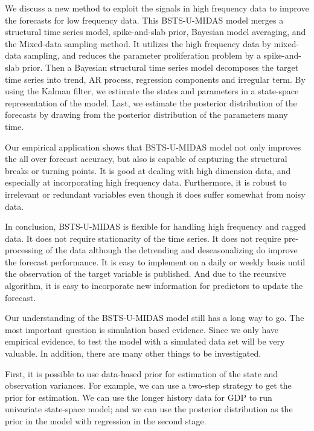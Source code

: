 \label{concl}

We discuss a new method to exploit the signals in high frequency data to improve the forecasts for low frequency data. This BSTS-U-MIDAS model merges a structural time series model, spike-and-slab prior,  Bayesian model averaging, and the Mixed-data sampling method. It utilizes the high frequency data by mixed-data sampling, and reduces the parameter proliferation problem by a spike-and-slab prior. Then a Bayesian structural time series model decomposes the target time series into trend, AR process, regression components and irregular term. By using the Kalman filter, we estimate the states and parameters in a state-space representation of the model. Last, we estimate the posterior distribution of the forecasts by drawing from the posterior distribution of the parameters many time. 

Our empirical application shows that BSTS-U-MIDAS model not only improves the all over forecast accuracy, but also is capable of capturing the structural breaks or turning points. It is good at dealing with high dimension data, and especially at incorporating high frequency data. Furthermore, it is robust to irrelevant or redundant variables even though it does suffer somewhat from noisy data. 


In conclusion, BSTS-U-MIDAS is flexible for handling high frequency and ragged data. It does not require stationarity of the time series. It does not require pre-processing of the data although the detrending and deseasonalizing do improve the forecast performance. It is easy to implement on a daily or weekly basis until  the observation of the target variable is published. And due to the recursive algorithm, it is easy to incorporate new information for predictors to update the forecast.   




Our understanding of the BSTS-U-MIDAS model still has a long way to go. The most important question is simulation based evidence. Since we only have empirical evidence, to test the model with a simulated data set will be very valuable. In addition, there are many other things to be investigated. 

First, it is possible to use data-based prior for estimation of the state and observation variances. For example, we can use a two-step strategy to get the prior for estimation. We can use the longer history data for GDP to run  univariate state-space model; and we can use the posterior distribution as the prior in the model with regression in the second stage. 

